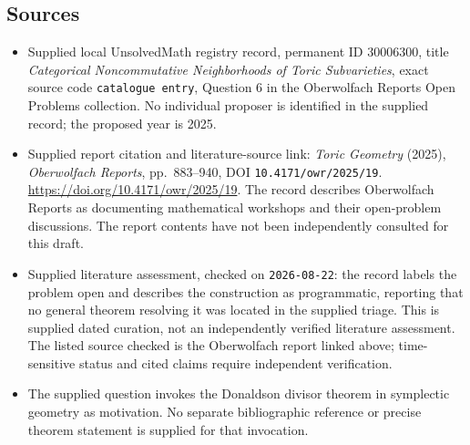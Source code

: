 \documentclass[11pt]{article}
\begin{document}
\subsection{Sources}
\begin{itemize}
\item Supplied local UnsolvedMath registry record, permanent ID \(30006300\), title \emph{Categorical Noncommutative Neighborhoods of Toric Subvarieties}, exact source code \texttt{catalogue entry}, Question 6 in the Oberwolfach Reports Open Problems collection. No individual proposer is identified in the supplied record; the proposed year is 2025.
\item Supplied report citation and literature-source link: \emph{Toric Geometry} (2025), \emph{Oberwolfach Reports}, pp.\ 883--940, DOI \texttt{10.4171/owr/2025/19}. \url{https://doi.org/10.4171/owr/2025/19}. The record describes Oberwolfach Reports as documenting mathematical workshops and their open-problem discussions. The report contents have not been independently consulted for this draft.
\item Supplied literature assessment, checked on \texttt{2026-08-22}: the record labels the problem open and describes the construction as programmatic, reporting that no general theorem resolving it was located in the supplied triage. This is supplied dated curation, not an independently verified literature assessment. The listed source checked is the Oberwolfach report linked above; time-sensitive status and cited claims require independent verification.
\item The supplied question invokes the Donaldson divisor theorem in symplectic geometry as motivation. No separate bibliographic reference or precise theorem statement is supplied for that invocation.
\end{itemize}
\end{document}
